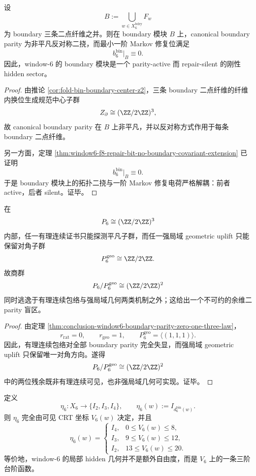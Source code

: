 \begin{theorem}\label{thm:conclusion-window6-repair-silent-boundary-module}
设
\[
B:=\bigcup_{w\in X_6^{\mathrm{bdry}}}F_w
\]
为 boundary 三条二点纤维之并。则在 boundary 模块 \(B\) 上，canonical boundary parity 为非平凡反对称二挠，而最小一阶 Markov 修复位满足
\[
b_6^{\mathrm{bin}}|_B\equiv 0.
\]
因此，window-\(6\) 的 boundary 模块是一个 parity-active 而 repair-silent 的刚性 hidden sector。
\end{theorem}
\begin{proof}
由推论 \ref{cor:fold-bin-boundary-center-z2}，三条 boundary 二点纤维的纤维内换位生成规范中心子群
\[
Z_{\partial}\cong (\ZZ/2\ZZ)^3,
\]
故 canonical boundary parity 在 \(B\) 上非平凡，并以反对称方式作用于每条 boundary 二点纤维。

另一方面，定理 \ref{thm:window6-f8-repair-bit-no-boundary-covariant-extension} 已证明
\[
b_6^{\mathrm{bin}}|_B\equiv 0.
\]
于是 boundary 模块上的拓扑二挠与一阶 Markov 修复电荷严格解耦：前者 active，后者 silent。证毕。
\end{proof}

\begin{corollary}[有理连续与强局域几何的联合盲区]\label{cor:conclusion-window6-rational-geometric-joint-blind-spot}
在
\[
P_6\cong (\ZZ/2\ZZ)^3
\]
内部，任一有理连续证书只能探测平凡子群，而任一强局域 geometric uplift 只能保留对角子群
\[
P_6^{\mathrm{geo}}\cong \ZZ/2\ZZ.
\]
故商群
\[
P_6/P_6^{\mathrm{geo}}\cong (\ZZ/2\ZZ)^2
\]
同时逃逸于有理连续包络与强局域几何两类机制之外；这给出一个不可约的余维二 parity 盲区。
\end{corollary}
\begin{proof}
由定理 \ref{thm:conclusion-window6-boundary-parity-zero-one-three-law}，
\[
r_{\mathrm{rat}}=0,
\qquad
r_{\mathrm{geo}}=1,
\qquad
P_6^{\mathrm{geo}}=\langle(1,1,1)\rangle.
\]
因此，有理连续包络对全部 boundary parity 完全失显，而强局域 geometric uplift 只保留唯一对角方向。遂得
\[
P_6/P_6^{\mathrm{geo}}\cong (\ZZ/2\ZZ)^2
\]
中的两位残余既非有理连续可见，也非强局域几何可实现。证毕。
\end{proof}

\begin{theorem}\label{thm:conclusion-window6-visible-coordinate-completely-determines-hidden-cubical-type}
定义
\[
\eta_6:X_6\longrightarrow \{I_2,I_3,I_4\},
\qquad
\eta_6(w):=I_{d_6^{\mathrm{bin}}(w)}.
\]
则 \(\eta_6\) 完全由可见 CRT 坐标 \(V_6(w)\) 决定，并且
\[
\eta_6(w)=
\begin{cases}
I_4, & 0\le V_6(w)\le 8,\\[2mm]
I_3, & 9\le V_6(w)\le 12,\\[2mm]
I_2, & 13\le V_6(w)\le 20.
\end{cases}
\]
等价地，window-\(6\) 的局部 hidden 几何并不是额外自由度，而是 \(V_6\) 上的一条三阶台阶函数。
\end{theorem}

